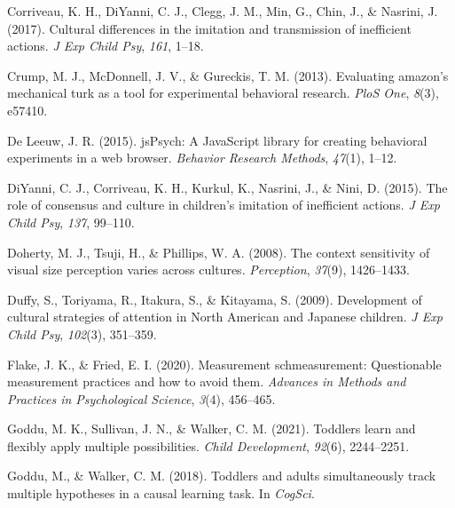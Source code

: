 \documentclass[
  man,floatsintext]{apa6}
\newlength{\cslhangindent}
\newlength{\cslentryspacingunit} %
\newenvironment{CSLReferences}[2] %
 {%
  \setlength{\parindent}{0pt}
  \ifodd #1
  \let\oldpar\par
  \def\par{\hangindent=\cslhangindent\oldpar}
  \fi
  \setlength{\parskip}{#2\cslentryspacingunit}
 }%
 {}
\begin{document}
\begin{CSLReferences}{1}{0}
\leavevmode{}%
Corriveau, K. H., DiYanni, C. J., Clegg, J. M., Min, G., Chin, J., \& Nasrini, J. (2017). Cultural differences in the imitation and transmission of inefficient actions. \emph{J Exp Child Psy}, \emph{161}, 1--18.

\leavevmode{}%
Crump, M. J., McDonnell, J. V., \& Gureckis, T. M. (2013). Evaluating amazon's mechanical turk as a tool for experimental behavioral research. \emph{PloS One}, \emph{8}(3), e57410.

\leavevmode{}%
De Leeuw, J. R. (2015). jsPsych: A JavaScript library for creating behavioral experiments in a web browser. \emph{Behavior Research Methods}, \emph{47}(1), 1--12.

\leavevmode{}%
DiYanni, C. J., Corriveau, K. H., Kurkul, K., Nasrini, J., \& Nini, D. (2015). The role of consensus and culture in children's imitation of inefficient actions. \emph{J Exp Child Psy}, \emph{137}, 99--110.

\leavevmode{}%
Doherty, M. J., Tsuji, H., \& Phillips, W. A. (2008). The context sensitivity of visual size perception varies across cultures. \emph{Perception}, \emph{37}(9), 1426--1433.

\leavevmode{}%
Duffy, S., Toriyama, R., Itakura, S., \& Kitayama, S. (2009). Development of cultural strategies of attention in {N}orth {A}merican and {J}apanese children. \emph{J Exp Child Psy}, \emph{102}(3), 351--359.

\leavevmode{}%
Flake, J. K., \& Fried, E. I. (2020). Measurement schmeasurement: Questionable measurement practices and how to avoid them. \emph{Advances in Methods and Practices in Psychological Science}, \emph{3}(4), 456--465.

\leavevmode{}%
Goddu, M. K., Sullivan, J. N., \& Walker, C. M. (2021). Toddlers learn and flexibly apply multiple possibilities. \emph{Child Development}, \emph{92}(6), 2244--2251.

\leavevmode{}%
Goddu, M., \& Walker, C. M. (2018). Toddlers and adults simultaneously track multiple hypotheses in a causal learning task. In \emph{CogSci}.


\end{CSLReferences}
\end{document}
